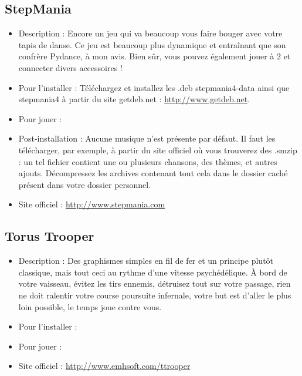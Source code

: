 \subsection{StepMania}
\begin{itemize}
\begingroup
{}
\item Description : Encore un jeu qui va beaucoup vous faire bouger avec votre tapis de danse. Ce jeu est beaucoup plus dynamique et entraînant que son confrère Pydance, à mon avis. Bien sûr, vous pouvez également jouer à 2 et connecter divers accessoires !{\par}
\endgroup
\item Pour l'installer : Téléchargez et installez les .deb stepmania4-data ainsi que stepmania4 à partir du site getdeb.net :
\url{http://www.getdeb.net}.{\par}
\item Pour jouer : 
\item Post-installation : Aucune musique n'est présente par défaut. Il faut les télécharger, par exemple, à partir du site officiel où vous trouverez des .smzip : un tel fichier contient une ou plusieurs chansons, des thèmes, et autres ajouts. Décompressez les archives contenant tout cela dans le dossier caché  présent dans votre dossier personnel.{\par}
\item Site officiel : \url{http://www.stepmania.com}{\par}
\end{itemize}
\subsection{Torus Trooper}
\begin{itemize}
\begingroup
{}
\item Description : Des graphismes simples en  fil de fer et un principe plutôt classique, mais tout ceci au rythme d'une vitesse psychédélique. À bord de votre vaisseau, évitez les tirs ennemis, détruisez tout sur votre passage, rien ne doit ralentir votre course poursuite infernale, votre but est d'aller le plus loin possible, le temps joue contre vous.{\par}
\endgroup
\item Pour l'installer : 
\item Pour jouer : 
\item Site officiel : \url{http://www.emhsoft.com/ttrooper}{\par}
\end{itemize}
